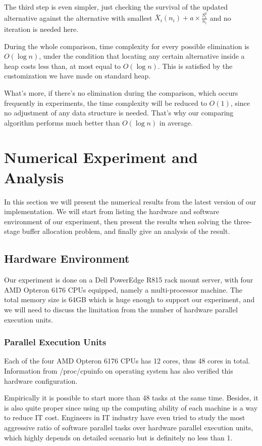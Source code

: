 \documentclass[12pt,a4paper]{report}
\begin{document}
The third step is even simpler, just checking the survival of the updated alternative against the alternative with smallest $\bar{X}_i(n_i) + a \times \frac{S_i^2}{n_i}$ and no iteration is needed here.

During the whole comparison, time complexity for every possible elimination is $O(\log n)$, under the condition that locating any certain alternative inside a heap costs less than, at most equal to $O(\log n)$. This is satisfied by the customization we have made on standard heap.

What's more, if there's no elimination during the comparison, which occurs frequently in experiments, the time complexity will be reduced to $O(1)$, since no adjustment of any data structure is needed. That's why our comparing algorithm performs much better than $O(\log n)$ in average.

\chapter{Numerical Experiment and Analysis}

In this section we will present the numerical results from the latest version of our implementation. We will start from listing the hardware and software environment of our experiment, then present the results when solving the three-stage buffer allocation problem, and finally give an analysis of the result.

\section{Hardware Environment}

Our experiment is done on a Dell PowerEdge R815 rack mount server, with four AMD Opteron 6176 CPUs equipped, namely a multi-processor machine. The total memory size is 64GB which is huge enough to support our experiment, and we will need to discuss the limitation from the number of hardware parallel execution units.

\subsection{Parallel Execution Units}

Each of the four AMD Opteron 6176 CPUs has 12 cores, thus 48 cores in total. Information from /proc/cpuinfo on operating system has also verified this hardware configuration.

Empirically it is possible to start more than 48 tasks at the same time. Besides, it is also quite proper since using up the computing ability of each machine is a way to reduce IT cost. Engineers in IT industry have even tried to study the most aggressive ratio of software parallel tasks over hardware parallel execution units, which highly depends on detailed scenario but is definitely no less than 1.
\end{document}
